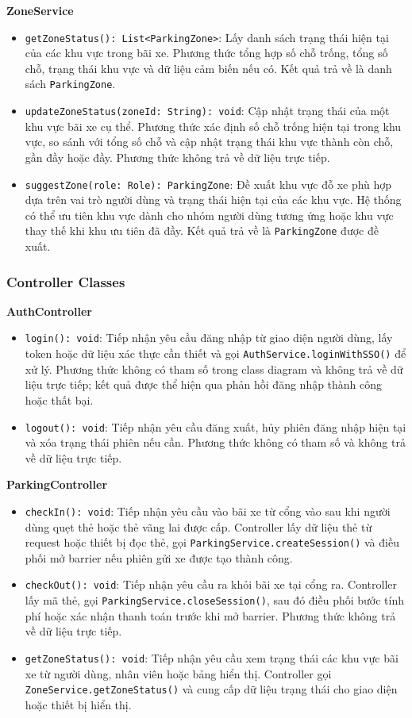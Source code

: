\noindent\textbf{ZoneService}
\begin{itemize}
    \item \texttt{getZoneStatus(): List<ParkingZone>}: Lấy danh sách trạng thái hiện tại của các khu vực trong bãi xe. Phương thức tổng hợp số chỗ trống, tổng số chỗ, trạng thái khu vực và dữ liệu cảm biến nếu có. Kết quả trả về là danh sách \texttt{ParkingZone}.
    \item \texttt{updateZoneStatus(zoneId: String): void}: Cập nhật trạng thái của một khu vực bãi xe cụ thể. Phương thức xác định số chỗ trống hiện tại trong khu vực, so sánh với tổng số chỗ và cập nhật trạng thái khu vực thành còn chỗ, gần đầy hoặc đầy. Phương thức không trả về dữ liệu trực tiếp.
    \item \texttt{suggestZone(role: Role): ParkingZone}: Đề xuất khu vực đỗ xe phù hợp dựa trên vai trò người dùng và trạng thái hiện tại của các khu vực. Hệ thống có thể ưu tiên khu vực dành cho nhóm người dùng tương ứng hoặc khu vực thay thế khi khu ưu tiên đã đầy. Kết quả trả về là \texttt{ParkingZone} được đề xuất.
\end{itemize}

\subsubsection{Controller Classes}

\noindent\textbf{AuthController}
\begin{itemize}
    \item \texttt{login(): void}: Tiếp nhận yêu cầu đăng nhập từ giao diện người dùng, lấy token hoặc dữ liệu xác thực cần thiết và gọi \texttt{AuthService.loginWithSSO()} để xử lý. Phương thức không có tham số trong class diagram và không trả về dữ liệu trực tiếp; kết quả được thể hiện qua phản hồi đăng nhập thành công hoặc thất bại.
    \item \texttt{logout(): void}: Tiếp nhận yêu cầu đăng xuất, hủy phiên đăng nhập hiện tại và xóa trạng thái phiên nếu cần. Phương thức không có tham số và không trả về dữ liệu trực tiếp.
\end{itemize}

\noindent\textbf{ParkingController}
\begin{itemize}
    \item \texttt{checkIn(): void}: Tiếp nhận yêu cầu vào bãi xe từ cổng vào sau khi người dùng quẹt thẻ hoặc thẻ vãng lai được cấp. Controller lấy dữ liệu thẻ từ request hoặc thiết bị đọc thẻ, gọi \texttt{ParkingService.createSession()} và điều phối mở barrier nếu phiên gửi xe được tạo thành công.
    \item \texttt{checkOut(): void}: Tiếp nhận yêu cầu ra khỏi bãi xe tại cổng ra. Controller lấy mã thẻ, gọi \texttt{ParkingService.closeSession()}, sau đó điều phối bước tính phí hoặc xác nhận thanh toán trước khi mở barrier. Phương thức không trả về dữ liệu trực tiếp.
    \item \texttt{getZoneStatus(): void}: Tiếp nhận yêu cầu xem trạng thái các khu vực bãi xe từ người dùng, nhân viên hoặc bảng hiển thị. Controller gọi \texttt{ZoneService.getZoneStatus()} và cung cấp dữ liệu trạng thái cho giao diện hoặc thiết bị hiển thị.
\end{itemize}

